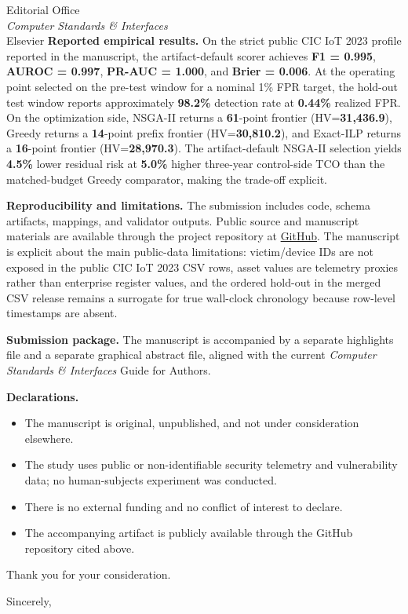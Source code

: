 \documentclass[11pt]{letter}
\begin{document}
\begin{letter}{
Editorial Office\\
\textit{Computer Standards \& Interfaces}\\
Elsevier}
\textbf{Reported empirical results.} On the strict public CIC IoT 2023 profile reported in the manuscript, the artifact-default scorer achieves \textbf{F1 = 0.995}, \textbf{AUROC = 0.997}, \textbf{PR-AUC = 1.000}, and \textbf{Brier = 0.006}. At the operating point selected on the pre-test window for a nominal 1\% FPR target, the hold-out test window reports approximately \textbf{98.2\%} detection rate at \textbf{0.44\%} realized FPR. On the optimization side, NSGA-II returns a \textbf{61}-point frontier (HV=\textbf{31,436.9}), Greedy returns a \textbf{14}-point prefix frontier (HV=\textbf{30,810.2}), and Exact-ILP returns a \textbf{16}-point frontier (HV=\textbf{28,970.3}). The artifact-default NSGA-II selection yields \textbf{4.5\%} lower residual risk at \textbf{5.0\%} higher three-year control-side TCO than the matched-budget Greedy comparator, making the trade-off explicit.

\textbf{Reproducibility and limitations.} The submission includes code, schema artifacts, mappings, and validator outputs. Public source and manuscript materials are available through the project repository at \href{https://github.com/ErcanErkalkan/AI_Enabled__Standards_Aligned_Security_Risk_Management}{GitHub}. The manuscript is explicit about the main public-data limitations: victim/device IDs are not exposed in the public CIC IoT 2023 CSV rows, asset values are telemetry proxies rather than enterprise register values, and the ordered hold-out in the merged CSV release remains a surrogate for true wall-clock chronology because row-level timestamps are absent.

\textbf{Submission package.} The manuscript is accompanied by a separate highlights file and a separate graphical abstract file, aligned with the current \textit{Computer Standards \& Interfaces} Guide for Authors.

\textbf{Declarations.}
\begin{itemize}[leftmargin=*, nosep]
  \item The manuscript is original, unpublished, and not under consideration elsewhere.
  \item The study uses public or non-identifiable security telemetry and vulnerability data; no human-subjects experiment was conducted.
  \item There is no external funding and no conflict of interest to declare.
  \item The accompanying artifact is publicly available through the GitHub repository cited above.
\end{itemize}

Thank you for your consideration.

\closing{Sincerely,}


\end{letter}
\end{document}
